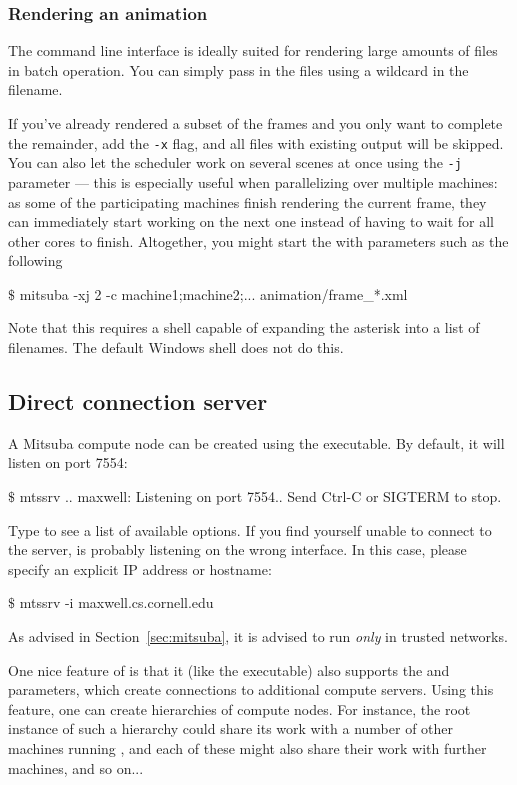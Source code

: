 \subsubsection{Rendering an animation}
The command line interface is ideally suited for rendering large amounts of files in batch
operation. You can simply pass in the files using a wildcard in the filename.

If you've already rendered a subset of the frames and you only want to complete the remainder,
add the \texttt{-x} flag, and all files with existing output will be skipped. You can also
let the scheduler work on several scenes at once using the \texttt{-j} parameter --- this is
especially useful when parallelizing over multiple machines: as some of the participating machines
finish rendering the current frame, they can immediately start working on the next one
instead of having to wait for all other cores to finish. Altogether, you
might start the with parameters such as the following
\begin{shell}
$\texttt{\$}$ mitsuba -xj 2 -c machine1;machine2;...  animation/frame_*.xml
\end{shell}
Note that this requires a shell capable of expanding the asterisk into a list of
filenames. The default Windows shell  does not do this.
\subsection{Direct connection server}
\label{sec:mtssrv}
A Mitsuba compute node can be created using the  executable. By default,
it will listen on port 7554:
\begin{shell}
$\texttt{\$}$ mtssrv
..
maxwell: Listening on port 7554.. Send Ctrl-C or SIGTERM to stop.
\end{shell}
Type  to see a list of available options.
If you find yourself unable to connect to the server,  is probably listening on
the wrong interface. In this case, please specify an explicit IP address or hostname:
\begin{shell}
$\texttt{\$}$ mtssrv -i maxwell.cs.cornell.edu
\end{shell}
As advised in Section~\ref{sec:mitsuba}, it is advised to run  \emph{only} in trusted networks.

One nice feature of  is that it (like the  executable)
also supports the  and  parameters, which create connections
to additional compute servers.
Using this feature, one can create hierarchies of compute nodes. For instance,
the root  instance of such a hierarchy could share its work with a
number of other  machines running , and each of these might also
share their work with further machines, and so on...

